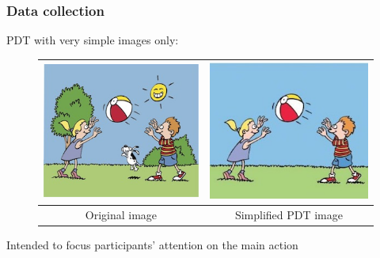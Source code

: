 \documentclass[handout,xcolor={dvipsnames}]{beamer}
\begin{document}
\begin{frame}
\frametitle{Data collection}
\medskip

PDT with very simple images only:

\begin{figure}[htb!]
\begin{center}
\begin{tabular}{|c|c|}
\hline
{\includegraphics[width=0.38\columnwidth]{figures/throw-original.jpg}} & {\includegraphics[width=0.38\columnwidth]{figures/I21cropped.jpg}} \\
\hline
Original image & Simplified PDT image \\
\hline
\end{tabular}
\end{center}
\end{figure}

Intended to focus participants' attention on the main action
\end{frame}
\end{document}
